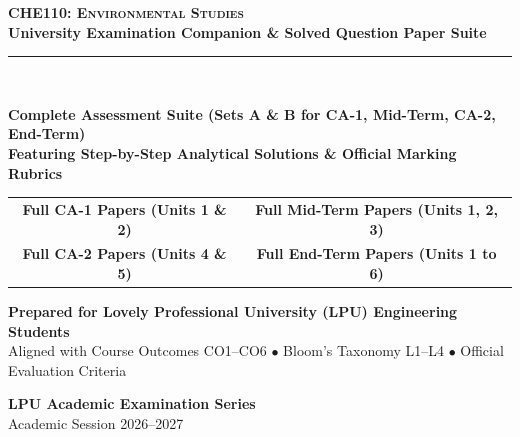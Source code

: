 \begin{titlepage}
\pagecolor{LPUNavy}
\color{white}
\vspace*{1.5cm}

\begin{center}
    {\Huge \bfseries \scshape CHE110: Environmental Studies}\\[5mm]
    {\LARGE \bfseries University Examination Companion \& Solved Question Paper Suite}\\[8mm]
    {\color{LPUGreen}\rule{0.8\textwidth}{2pt}}\\[10mm]

    \begin{tcolorbox}[enhanced, width=0.88\textwidth, colback=white, colframe=LPUGreen, boxrule=1.5pt, arc=3mm, halign=center]
        \color{DarkSlate}
        \vspace{2mm}
        {\Large\bfseries Complete Assessment Suite (Sets A \& B for CA-1, Mid-Term, CA-2, End-Term)}\\[3mm]
        {\large\bfseries Featuring Step-by-Step Analytical Solutions \& Official Marking Rubrics}\\[3mm]
        \begin{tabular}{cc}
            \color{LPUGreen}\textbf{Full CA-1 Papers (Units 1 \& 2)} & \quad \color{LPUGreen}\textbf{Full Mid-Term Papers (Units 1, 2, 3)} \\
            \color{LPUGreen}\textbf{Full CA-2 Papers (Units 4 \& 5)} & \quad \color{LPUGreen}\textbf{Full End-Term Papers (Units 1 to 6)} \\
        \end{tabular}
        \vspace{2mm}
    \end{tcolorbox}

    \vfill

    {\large \bfseries Prepared for Lovely Professional University (LPU) Engineering Students}\\[2mm]
    {\small Aligned with Course Outcomes CO1--CO6 $\bullet$ Bloom's Taxonomy L1--L4 $\bullet$ Official Evaluation Criteria}\\[10mm]

    \begin{tcolorbox}[width=0.6\textwidth, colback=LPUNavy!80!black, colframe=white, boxrule=0.5pt, halign=center]
        \color{white}
        \textbf{LPU Academic Examination Series}\\[1mm]
        {\footnotesize Academic Session 2026--2027}
    \end{tcolorbox}
    \vspace*{1cm}
\end{center}
\end{titlepage}
\nopagecolor
\newpage
